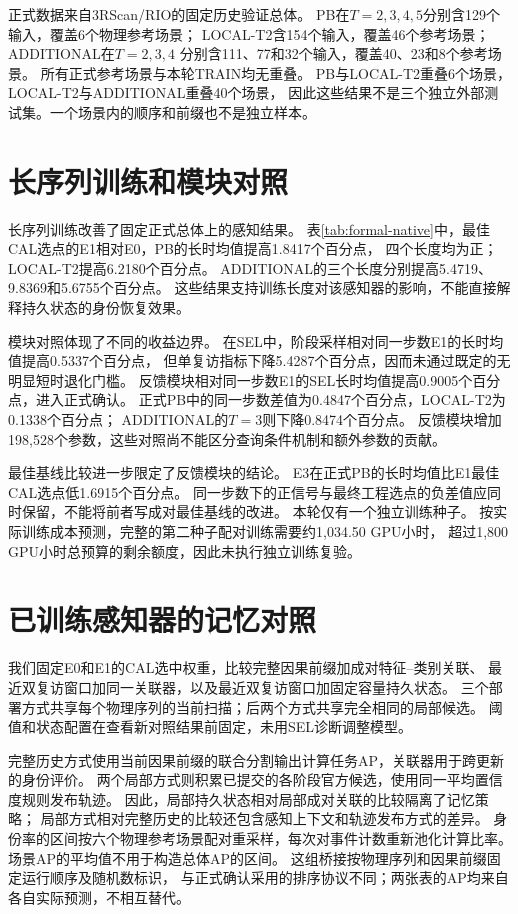 \documentclass[10pt,twocolumn]{ctexart}
\begin{document}
正式数据来自3RScan/RIO\cite{wald2019rio}的固定历史验证总体。
PB在$T=2,3,4,5$分别含129个输入，覆盖6个物理参考场景；
LOCAL-T2含154个输入，覆盖46个参考场景；ADDITIONAL在$T=2,3,4$
分别含111、77和32个输入，覆盖40、23和8个参考场景。
所有正式参考场景与本轮TRAIN均无重叠。
PB与LOCAL-T2重叠6个场景，LOCAL-T2与ADDITIONAL重叠40个场景，
因此这些结果不是三个独立外部测试集。一个场景内的顺序和前缀也不是独立样本。

\section{长序列训练和模块对照}



长序列训练改善了固定正式总体上的感知结果。
表\ref{tab:formal-native}中，最佳CAL选点的E1相对E0，PB的长时均值提高1.8417个百分点，
四个长度均为正；LOCAL-T2提高6.2180个百分点。
ADDITIONAL的三个长度分别提高5.4719、9.8369和5.6755个百分点。
这些结果支持训练长度对该感知器的影响，不能直接解释持久状态的身份恢复效果。

模块对照体现了不同的收益边界。
在SEL中，阶段采样相对同一步数E1的长时均值提高0.5337个百分点，
但单复访指标下降5.4287个百分点，因而未通过既定的无明显短时退化门槛。
反馈模块相对同一步数E1的SEL长时均值提高0.9005个百分点，进入正式确认。
正式PB中的同一步数差值为0.4847个百分点，LOCAL-T2为0.1338个百分点；
ADDITIONAL的$T=3$则下降0.8474个百分点。
反馈模块增加198,528个参数，这些对照尚不能区分查询条件机制和额外参数的贡献。

最佳基线比较进一步限定了反馈模块的结论。
E3在正式PB的长时均值比E1最佳CAL选点低1.6915个百分点。
同一步数下的正信号与最终工程选点的负差值应同时保留，不能将前者写成对最佳基线的改进。
本轮仅有一个独立训练种子。
按实际训练成本预测，完整的第二种子配对训练需要约1,034.50 GPU小时，
超过1,800 GPU小时总预算的剩余额度，因此未执行独立训练复验。

\section{已训练感知器的记忆对照}

我们固定E0和E1的CAL选中权重，比较完整因果前缀加成对特征--类别关联、
最近双复访窗口加同一关联器，以及最近双复访窗口加固定容量持久状态。
三个部署方式共享每个物理序列的当前扫描；后两个方式共享完全相同的局部候选。
阈值和状态配置在查看新对照结果前固定，未用SEL诊断调整模型。

完整历史方式使用当前因果前缀的联合分割输出计算任务AP，关联器用于跨更新的身份评价。
两个局部方式则积累已提交的各阶段官方候选，使用同一平均置信度规则发布轨迹。
因此，局部持久状态相对局部成对关联的比较隔离了记忆策略；
局部方式相对完整历史的比较还包含感知上下文和轨迹发布方式的差异。
身份率的区间按六个物理参考场景配对重采样，每次对事件计数重新池化计算比率。
场景AP的平均值不用于构造总体AP的区间。
这组桥接按物理序列和因果前缀固定运行顺序及随机数标识，
与正式确认采用的排序协议不同；两张表的AP均来自各自实际预测，不相互替代。
\end{document}
